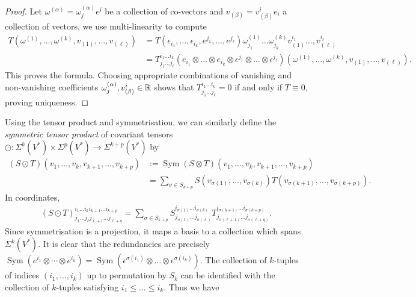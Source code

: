 \begin{proof}
	Let $\omega^{(\alpha)} = \omega^{(\alpha)}_j \epsilon^j$ be a collection of co-vectors and $v_{(\beta)} = v^i_{(\beta)} e_i$ a collection of vectors, we use multi-linearity to compute
		\begin{align*}
			T( \omega^{(1)},  \dots, \omega^{(k)}, v_{(1)} , \dots, v_{(\ell)})
				&= T(\epsilon_{i_1}, \dots , \epsilon_{i_k} ,e^{j_1} , \dots, e^{j_\ell})  \omega_{j_1}^{(1)} \dots \omega_{j_k}^{(k)}  v^{i_1}_{(1)} \dots, v^{i_\ell}_{(\ell)} \\
				&=T^{i_1\dots i_k}_{j_1 \dots j_\ell} (e_{i_1} \otimes \dots \otimes e_{i_k} \otimes \epsilon^{j_1} \otimes \dots \otimes \epsilon^{j_\ell}) ( \omega^{(1)},  \dots, \omega^{(k)}, v_{(1)} , \dots, v_{(\ell)}).
		\end{align*}
	This proves the formula. Choosing appropriate combinations of vanishing and non-vanishing coefficients $\omega^{(\alpha)}_j, v^i_{(\beta)} \in \mathbb R$ shows that $T^{i_1\dots i_k}_{j_1 \dots j_\ell} = 0$ if and only if $T \equiv 0$, proving uniqueness. 
\end{proof}
	
Using the tensor product and symmetrisation, we can similarly define the \emph{symmetric tensor product} of covariant tensors $\odot : \Sigma^k (V^*) \times \Sigma^p (V^*) \to \Sigma^{k + p} (V^*)$ by  
	\begin{align*}
		(S \odot T)(v_1, \dots, v_k, v_{k + 1}, \dots, v_{k + p}) 
			&:= \operatorname{Sym} (S \otimes T)(v_1, \dots, v_k, v_{k + 1}, \dots, v_{k + p})  \\
			&= \sum_{\sigma \in S_{k + p}} S(v_{\sigma(1)}, \dots, v_{\sigma(k)}) T(v_{\sigma(k + 1)}, \dots, v_{\sigma(k + p)}).
	\end{align*}	
In coordinates, 
	\begin{align*}
		(S \odot T)^{i_1 \dots i_k i_{k + 1} \dots i_{k + p}}_{j_1 \dots j_\ell j_{\ell + 1} \dots j_{\ell + q}} = \sum_{\sigma \in S_{k + p}} S^{i_{\sigma(1)} \dots i_{\sigma(k)}}_{j_{\sigma(1)} \dots j_{\sigma(\ell)}} T^{i_{{\sigma(k + 1)}} \dots i_{{\sigma(k + p)}}}_{j_{{\sigma(\ell + 1)}} \dots j_{{\sigma(\ell + q)}}}.
	\end{align*}	
Since symmetrisation is a projection, it maps a basis to a collection which spans $\Sigma^k (V^*)$. It is clear that the redundancies are precisely $\operatorname{Sym}(e^{i_1} \otimes \cdots \otimes e^{i_k})  = \operatorname{Sym} (\epsilon^{\sigma(i_1)} \otimes \dots \otimes \epsilon^{\sigma(i_k)})$. The collection of $k$-tuples of indices $(i_1, \dots, i_k)$ up to permutation by $S_k$ can be identified with the collection of $k$-tuples satisfying $i_1 \leq \dots \leq i_k$. Thus we have 


